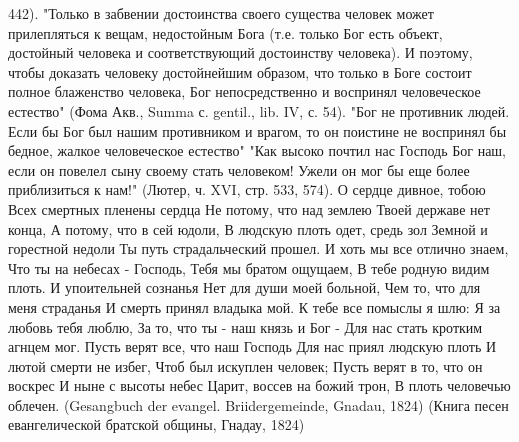 \documentclass[12pt,oneside]{book}
\begin{document}
442). "Только в забвении достоинства своего существа человек может прилепляться к вещам, недостойным Бога (т.е. только Бог есть объект, достойный человека и соответствующий достоинству человека). И поэтому, чтобы доказать человеку достойнейшим образом, что только в Боге состоит полное блаженство человека, Бог непосредственно и воспринял человеческое естество" (Фома Акв., Summa с. gentil., lib. IV, с. 54). "Бог не противник людей. Если бы Бог был нашим противником и врагом, то он поистине не воспринял бы бедное, жалкое человеческое естество" "Как высоко почтил нас Господь Бог наш, если он повелел сыну своему стать человеком! Ужели он мог бы еще более приблизиться к нам!" (Лютер, ч. XVI, стр. 533, 574). О сердце дивное, тобою Всех смертных пленены сердца Не потому, что над землею Твоей державе нет конца, А потому, что в сей юдоли, В людскую плоть одет, средь зол Земной и горестной недоли Ты путь страдальческий прошел. И хоть мы все отлично знаем, Что ты на небесах - Господь, Тебя мы братом ощущаем, В тебе родную видим плоть. И упоительней сознанья Нет для души моей больной, Чем то, что для меня страданья И смерть принял владыка мой. К тебе все помыслы я шлю: Я за любовь тебя люблю, За то, что ты - наш князь и Бог - Для нас стать кротким агнцем мог. Пусть верят все, что наш Господь Для нас приял людскую плоть И лютой смерти не избег, Чтоб был искуплен человек; Пусть верят в то, что он воскрес И ныне с высоты небес Царит, воссев на божий трон, В плоть человечью облечен. (Gesangbuch der evangel. Briidergemeinde, Gnadau, 1824) (Книга песен евангелической братской общины, Гнадау, 1824)
\end{document}
